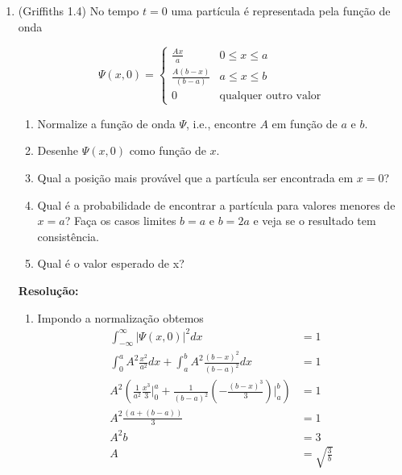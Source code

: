 \documentclass[a4paper, 12pt, notitlepage]{article}
\begin{document}
\begin{enumerate}
\begin{enumerate}
\end{enumerate}

\item (Griffiths 1.4) No tempo $t=0$ uma partícula é representada pela função de onda

\begin{equation*}
  \Psi(x, 0) = 
    \begin{cases}
    \frac{Ax}{a} &0\le x \le a\\
    \frac{A(b-x)}{(b-a)} &a \le x \le b\\
    0 &\text{qualquer outro valor}
    \end{cases}
\end{equation*}

\begin{enumerate}
  \item Normalize a função de onda $\Psi$, i.e., encontre $A$ em função de $a$ e $b$.
  \item Desenhe $\Psi(x, 0)$ como função de $x$.
  \item Qual a posição mais provável que a partícula ser encontrada em $x=0$?
  \item Qual é a probabilidade de encontrar a partícula para valores menores de $x = a$? Faça os casos limites $b=a$ e $b=2a$ e veja se o resultado tem consistência.
  \item Qual é o valor esperado de x?
\end{enumerate}

\textbf{Resolução: }\linebreak
\begin{enumerate}
  \item Impondo a normalização obtemos
  \begin{align*}
    \int_{-\infty}^{\infty} |\Psi(x,0)|^2 dx &= 1 \\
    \int_0^a A^2 \frac{x^2}{a^2} dx + \int_a^b A^2 \frac{(b-x)^2}{(b-a)^2} dx &= 1 \\
    A^2\left(\frac{1}{a^2} \frac{x^3}{3}\Big|_0^a + \frac{1}{(b-a)^2} \left(-\frac{(b-x)^3}{3}\right)\Big|_a^b\right) &= 1 \\
    A^2 \frac{\left(a + (b-a)\right)}{3} &= 1 \\
    A^2 b &= 3 \\
    A &= \sqrt{\frac{3}{b}}
  \end{align*}
  

\end{enumerate}
\end{enumerate}
\end{document}

